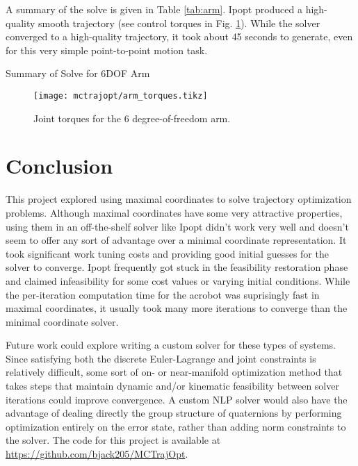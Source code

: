\documentclass[../root.tex]{subfiles}
\begin{document}
A summary of the solve is given in Table \ref{tab:arm}. Ipopt produced a high-quality
smooth trajectory (see control torques in Fig. \ref{fig:arm_torques}). While the solver converged
to a high-quality trajectory, it took about 45 seconds to generate, even for this very simple 
point-to-point motion task. 

\begin{table}
    \centering 
    \caption{Summary of Solve for 6DOF Arm}
    
    \label{tab:arm}
\end{table}

\begin{figure}
    \centering
    \texttt{[image: mctrajopt/arm\_torques.tikz]}
    \caption{Joint torques for the 6 degree-of-freedom arm.}
    \label{fig:arm_torques}
\end{figure}

\section{Conclusion}
This project explored using maximal coordinates to solve trajectory optimization problems.
Although maximal coordinates have some very attractive properties, using them in an 
off-the-shelf solver like Ipopt didn't work very well and doesn't seem to offer any sort of 
advantage over a minimal coordinate representation. It took significant work tuning costs
and providing good initial guesses for the solver to converge. Ipopt frequently got stuck 
in the feasibility restoration phase and claimed infeasibility for some cost values or 
varying initial conditions. While the per-iteration computation time for the acrobot was 
suprisingly fast in maximal coordinates, it usually took many more iterations to converge 
than the minimal coordinate solver. 

Future work could explore writing a custom solver for these types of systems. Since 
satisfying both the discrete Euler-Lagrange and joint constraints is relatively difficult,
some sort of on- or near-manifold optimization method that takes steps that maintain 
dynamic and/or kinematic feasibility between solver iterations could improve convergence. 
A custom NLP solver would also have the advantage of dealing directly the group structure of
quaternions by performing optimization entirely on the error state, rather than adding 
norm constraints to the solver. The code for this project is available at
{\small \url{https://github.com/bjack205/MCTrajOpt}}.
\end{document}
